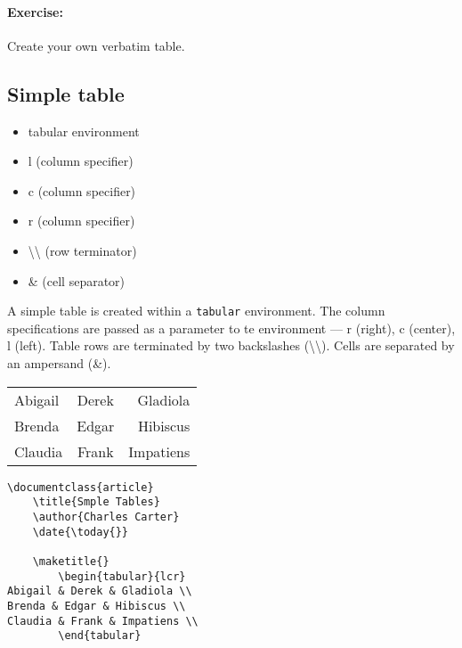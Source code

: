         \paragraph{Exercise:} Create your own verbatim table.

        \subsection{Simple table}
        \label{Simple table}
        
        \begin{framed}
            \begin{itemize}
                \item{tabular environment}
                \item{l (column specifier)}
                \item{c (column specifier)}
                \item{r (column specifier)}
                \item{\textbackslash\textbackslash{} (row terminator)}
                \item{\& (cell separator)}
            \end{itemize}
        \end{framed}

        A simple \Lx{} table is created within a \texttt{tabular} environment. The column specifications are passed as a parameter to te environment --- r (right), c (center), l (left). Table rows are terminated by two backslashes (\textbackslash\textbackslash). Cells are separated by an ampersand (\&).

        \begin{tabular}{lcr}
Abigail &  Derek &   Gladiola \\
Brenda &  Edgar &   Hibiscus \\
Claudia &  Frank &   Impatiens \\
        \end{tabular}


        \begin{verbatim}
\documentclass{article}
    \title{Smple Tables}
    \author{Charles Carter}
    \date{\today{}}
 
    \maketitle{}
        \begin{tabular}{lcr}
Abigail & Derek & Gladiola \\
Brenda & Edgar & Hibiscus \\
Claudia & Frank & Impatiens \\
        \end{tabular}
    
        \end{verbatim}

